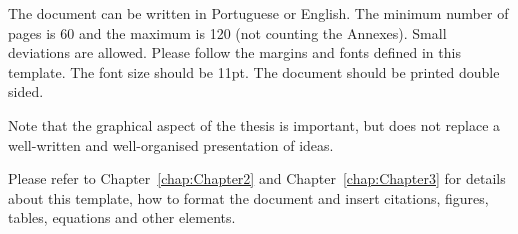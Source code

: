 The document can be written in Portuguese or English. The minimum number of pages is 60 and the maximum is 120 (not counting the Annexes). Small deviations are allowed. Please follow the margins and fonts  defined in this template. The font size should be 11pt. The document should be printed double sided.

Note that the graphical aspect of the thesis is important, but does not replace a well-written and well-organised presentation of ideas.

Please refer to Chapter~\ref{chap:Chapter2} and Chapter~\ref{chap:Chapter3} for details about this template, how to format the document and insert citations, figures, tables, equations and other elements.